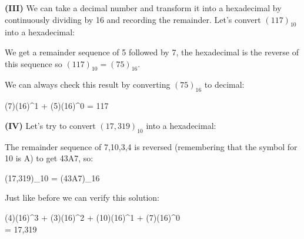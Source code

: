 \documentclass[12pt]{article}
\begin{document}
	\hspace{0.45cm}
	\begin{minipage}[t]{.5\linewidth} 
		\par\noindent \textbf{(III)} We can take a decimal number and transform it into a hexadecimal by continuously dividing by 16 and recording the remainder. Let's convert \( (117)_{10}\) into a hexadecimal:
		
		\begin{flalign*} 
			 \;\; 
		\end{flalign*}
		
		\par\noindent We get a remainder sequence of 5 followed by 7, the hexadecimal is the reverse of this sequence so \((117)_{10} = (75)_{16}\).
		\newline
		\par\noindent We can always check this result by converting \((75)_{16}\) to decimal:
		\begin{flalign*}
			(7)(16)^1 + (5)(16)^0 = 117
		\end{flalign*}
		\par\noindent \textbf{(IV)} Let's try to convert \((17,319)_{10}\) into a hexadecimal:  
		\begin{flalign*}
			  \intlongdivision{67}{16}
			\intlongdivision{4}{16}
		\end{flalign*}
		\par\noindent The remainder sequence of 7,10,3,4 is reversed (remembering that the symbol for 10 is A) to get 43A7, so:
		\begin{flalign*}
			(17,319)_{10} = (43A7)_{16}
		\end{flalign*}
		\par\noindent Just like before we can verify this solution:
		\begin{flalign*}
			(4)(16)^3 + (3)(16)^2 + (10)(16)^1 + (7)(16)^0 \\ = 17,319
		\end{flalign*}
	\end{minipage}
\end{document}
